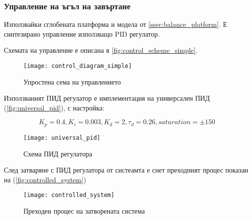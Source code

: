 \subsubsection{Управление на ъгъл на завъртане}

Използвайки сглобената платформа и модела от \autoref{ssec:balance_platform}.
Е синтезирано управление използващо PID регулатор.

Схемата на управление е описана в \autoref{fig:control_scheme_simple}.

\begin{figure}[htpb!]
    \centering
    \texttt{[image: control\_diagram\_simple]}
    \caption{Упростена сема на управлението}
    \label{fig:control_scheme_simple}
\end{figure}

Използваният ПИД регулатор е имплементация на универсален ПИД (\autoref{fig:universal_pid}), с настройка:

\begin{equation*}
    K_p=0.4, K_i=0.003, K_d=2, \tau_d=0.26, saturation=\pm150
\end{equation*}


\begin{figure}[htpb!]
    \centering
    \texttt{[image: universal\_pid]}
    \caption{Схема ПИД регулатора}
    \label{fig:universal_pid}
\end{figure}

След затваряне с ПИД регулатора от систеамта е снет преходният процес показан на (\autoref{fig:controlled_system})

\begin{figure}[htpb!]
    \centering
    \texttt{[image: controlled\_system]}
    \caption{Преходен процес на затворената система}
    \label{fig:controlled_system}
\end{figure}







